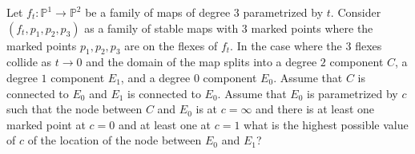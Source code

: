 Let $f_t:\mathbb{P}^1\rightarrow \mathbb{P}^2$ be a family of maps of degree 3 parametrized by $t$. Consider $(f_t,p_1,p_2,p_3)$ as a family of stable maps with $3$ marked points where the marked points $p_1,p_2,p_3$ are on the flexes of $f_t$. In the case where the $3$ flexes collide as $t\rightarrow 0$ and the domain of the map splits into a degree $2$ component $C$, a degree $1$ component $E_1$, and  a degree $0$ component $E_0$. Assume that $C$ is connected to $E_0$ and $E_1$ is connected to $E_0$. Assume that $E_0$ is parametrized by $c$ such that the node between $C$ and $E_0$ is at $c=\infty$ and there is at least one marked point at $c=0$ and at least one at $c=1$ what is the highest possible value of $c$ of the location of the node between $E_0$ and $E_1$?
